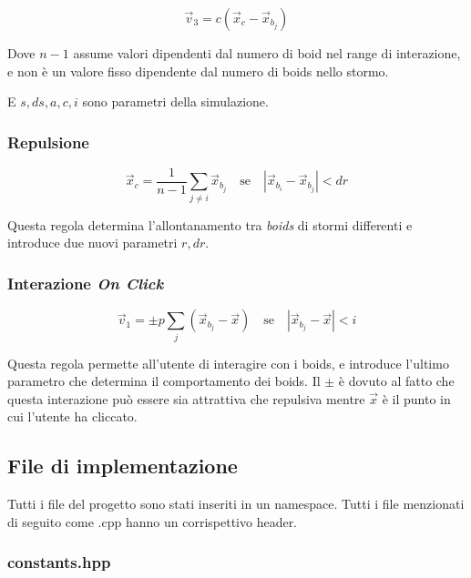 \documentclass[10pt,a4paper]{article}
\begin{document}
\begin{equation*}
    \vec{v}_3 = c (\vec{x}_{c} - \vec{x}_{b_j})
\end{equation*}

Dove $n-1$ assume valori dipendenti dal numero di boid nel range di interazione, e non è un valore fisso dipendente dal numero di boids nello stormo.

E $s, ds, a, c, i$ sono parametri della simulazione.

\subsubsection{Repulsione}

\begin{equation*}
    \vec{x}_c = \frac{1}{n-1} \sum_{j \neq i} \vec{x}_{b_j} \quad \text{se} \quad \left| \vec{x}_{b_i} - \vec{x}_{b_j} \right| < dr
\end{equation*}

Questa regola determina l'allontanamento tra \textit{boids} di stormi differenti e introduce due nuovi parametri $r, dr$.

\subsubsection{Interazione \textit{On Click}}

\begin{equation*}
    \vec{v}_1 = \pm p \sum_{j} (\vec{x}_{b_j} - \vec{x}) \quad \text{se} \quad \left| \vec{x}_{b_j} - \vec{x} \right| < i
\end{equation*}

Questa regola permette all'utente di interagire con i boids, e introduce l'ultimo parametro che determina il comportamento dei boids. Il $\pm$ è dovuto al fatto che questa interazione può essere sia attrattiva che repulsiva mentre $\vec{x}$ è il punto in cui l'utente ha cliccato.

\newpage

\subsection{File di implementazione}

Tutti i file del progetto sono stati inseriti in un namespace. Tutti i file menzionati di seguito come .cpp hanno un corrispettivo header.

\subsubsection{constants.hpp}
\end{document}
